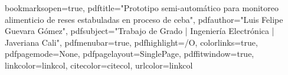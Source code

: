

\hypersetup
{
bookmarksopen=true,
pdftitle="Prototipo semi-automático para monitoreo alimenticio de reses estabuladas en proceso de ceba",
pdfauthor="Luis Felipe Guevara Gómez", 
pdfsubject="Trabajo de Grado | Ingeniería Electrónica | Javeriana Cali", %
pdfmenubar=true, %
pdfhighlight=/O, %
colorlinks=true, %
pdfpagemode=None, %
pdfpagelayout=SinglePage, %
pdffitwindow=true, %
linkcolor=linkcol, %
citecolor=citecol, %
urlcolor=linkcol %
}


\setcounter{secnumdepth}{3}
\setcounter{tocdepth}{2}


\newcommand{\pd}[2]{\frac{\partial #1}{\partial #2}}
\def\abs{\operatorname{abs}}
\def\argmax{\operatornamewithlimits{arg\,max}}
\def\argmin{\operatornamewithlimits{arg\,min}}
\def\diag{\operatorname{Diag}}
\newcommand{\eqRef}[1]{(\ref{#1})}

\usepackage{rotating}                    %
\usepackage{natbib}                  %
\usepackage{fancyhdr}                    %

  

\pagestyle{fancy}                       %
\fancyfoot{}                            %


